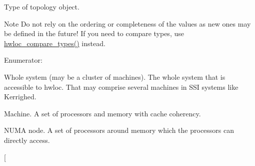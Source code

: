 Type of topology object. \begin{DoxyNote}{Note}
Do not rely on the ordering or completeness of the values as new ones may be defined in the future! If you need to compare types, use \hyperlink{group__hwlocality__types_ga1820ea0dfd8e9dca28f9ea7624df5ae2}{hwloc\_\-compare\_\-types()} instead. 
\end{DoxyNote}
\begin{Desc}
\item[Enumerator: ]\par
\begin{description}
\item[{\em 
\hypertarget{group__hwlocality__types_ggacd37bb612667dc437d66bfb175a8dc55a3aa1b842d1fd4207ebce171f95a244ec}{
HWLOC\_\-OBJ\_\-SYSTEM}
\label{group__hwlocality__types_ggacd37bb612667dc437d66bfb175a8dc55a3aa1b842d1fd4207ebce171f95a244ec}
}]Whole system (may be a cluster of machines). The whole system that is accessible to hwloc. That may comprise several machines in SSI systems like Kerrighed. \item[{\em 
\hypertarget{group__hwlocality__types_ggacd37bb612667dc437d66bfb175a8dc55a3f4e83ffc4a259354959ae8a9eaa2a80}{
HWLOC\_\-OBJ\_\-MACHINE}
\label{group__hwlocality__types_ggacd37bb612667dc437d66bfb175a8dc55a3f4e83ffc4a259354959ae8a9eaa2a80}
}]Machine. A set of processors and memory with cache coherency. \item[{\em 
\hypertarget{group__hwlocality__types_ggacd37bb612667dc437d66bfb175a8dc55aaf0964881117bdedf1a5e9332cd120dd}{
HWLOC\_\-OBJ\_\-NODE}
\label{group__hwlocality__types_ggacd37bb612667dc437d66bfb175a8dc55aaf0964881117bdedf1a5e9332cd120dd}
}]NUMA node. A set of processors around memory which the processors can directly access. \item[{\em 
}
\end{description}
\end{Desc}
